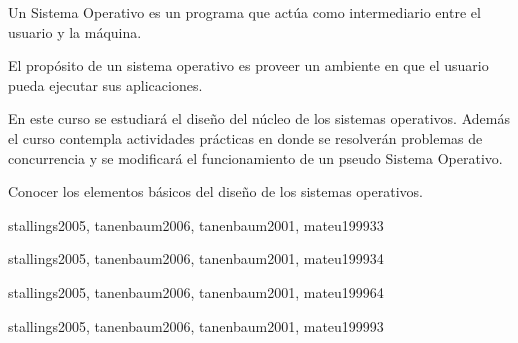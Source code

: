 \begin{syllabus}


\begin{justification}
Un Sistema Operativo es un programa que actúa como intermediario entre el usuario y la máquina.

El propósito de un sistema operativo es proveer un ambiente en que el usuario pueda ejecutar sus aplicaciones.

En este curso se estudiará el diseño del núcleo de los sistemas operativos.
Además el curso contempla actividades prácticas en donde se resolverán problemas de 
concurrencia y se modificará el funcionamiento de un pseudo Sistema Operativo.
\end{justification}

\begin{goals}
\item Conocer los elementos básicos del diseño de los sistemas operativos.
\end{goals}

\begin{outcomes}
\end{outcomes}

\begin{unit}{\ALDistributedAlgorithmsDef}{stallings2005, tanenbaum2006, tanenbaum2001, mateu1999}{3}{3}
   \ALDistributedAlgorithmsAllTopics
   \ALDistributedAlgorithmsAllObjectives
\end{unit}

\begin{unit}{\OSOverviewofOperatingSystemsDef}{stallings2005, tanenbaum2006, tanenbaum2001, mateu1999}{3}{4}
    \OSOverviewofOperatingSystemsAllTopics
    \OSOverviewofOperatingSystemsAllObjectives
\end{unit}

\begin{unit}{\OSOperatingSystemsPrinciplesDef}{stallings2005, tanenbaum2006, tanenbaum2001, mateu1999}{6}{4}
    \OSOperatingSystemsPrinciplesAllTopics
    \OSOperatingSystemsPrinciplesAllObjectives
\end{unit}

\begin{unit}{\OSConcurrencyDef}{stallings2005, tanenbaum2006, tanenbaum2001, mateu1999}{9}{3}
    \OSConcurrencyAllTopics
    \OSConcurrencyAllObjectives
\end{unit}


\end{syllabus}
